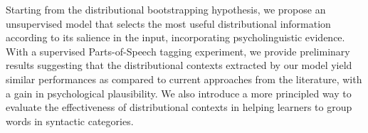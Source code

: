 Starting from the distributional bootstrapping hypothesis, we propose an unsupervised model that selects the most useful distributional information according to its salience in the input, incorporating psycholinguistic evidence. With a supervised Parts-of-Speech tagging experiment, we provide preliminary results suggesting that the distributional contexts extracted by our model yield similar performances as compared to current approaches from the literature, with a gain in psychological plausibility. We also introduce a more principled way to evaluate the effectiveness of distributional contexts in helping learners to group words in syntactic categories.
